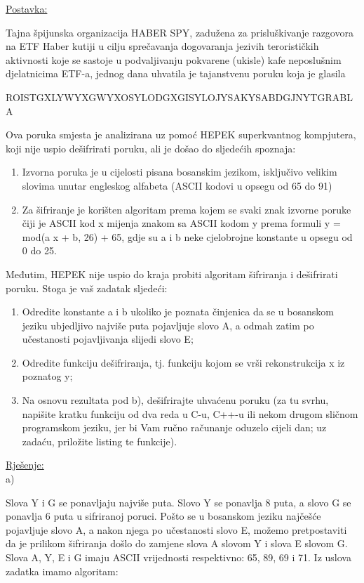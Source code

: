 \documentclass[12pt]{article}
\begin{document}
\underline{Postavka:}

Tajna špijunska organizacija HABER SPY, zadužena za prisluškivanje razgovora na ETF Haber kutiji u cilju sprečavanja dogovaranja jezivih terorističkih aktivnosti koje se sastoje u podvaljivanju pokvarene (ukisle) kafe neposlušnim djelatnicima ETF-a, jednog dana uhvatila je tajanstvenu poruku koja je glasila

ROISTGXLYWYXGWYXOSYLODGXGISYLOJYSAKYSABDGJNYTGRABLA

Ova poruka smjesta je analizirana uz pomoć HEPEK superkvantnog kompjutera, koji nije uspio dešifrirati poruku, ali je došao do sljedećih spoznaja:

\begin{enumerate}
\item Izvorna poruka je u cijelosti pisana bosanskim jezikom, isključivo velikim slovima unutar engleskog alfabeta (ASCII kodovi u opsegu od 65 do 91)
\item Za šifriranje je korišten algoritam prema kojem se svaki znak izvorne poruke čiji je ASCII kod x mijenja znakom sa ASCII kodom y prema formuli y = mod(a x + b, 26) + 65, gdje su a i b neke cjelobrojne konstante u opsegu od 0 do 25.
\end{enumerate}

Međutim, HEPEK nije uspio do kraja probiti algoritam šifriranja i dešifrirati poruku. Stoga je vaš zadatak sljedeći:

\begin{enumerate}
\item Odredite konstante a i b ukoliko je poznata činjenica da se u bosanskom jeziku ubjedljivo najviše puta pojavljuje slovo A, a odmah zatim po učestanosti pojavljivanja slijedi slovo E;
\item Odredite funkciju dešifriranja, tj. funkciju kojom se vrši rekonstrukcija x iz poznatog y;
\item Na osnovu rezultata pod b), dešifrirajte uhvaćenu poruku (za tu svrhu, napišite kratku funkciju od dva reda u C-u, C++-u ili nekom drugom sličnom programskom jeziku, jer bi Vam ručno računanje oduzelo cijeli dan; uz zadaću, priložite listing te funkcije).
\end{enumerate}

\underline{Rješenje:}\\
\newpage
a)

\hspace{0.65cm}Slova Y i G se ponavljaju najviše puta. Slovo Y se ponavlja 8 puta, a slovo G se ponavlja 6 puta u sifriranoj poruci. Pošto se u bosanskom jeziku najčešće pojavljuje slovo A, a nakon njega po učestanosti slovo E, možemo pretpostaviti da je prilikom šifriranja došlo do zamjene slova A slovom Y i slova E slovom G. Slova A, Y, E i G imaju ASCII vrijednosti respektivno: 65, 89, 69 i 71. Iz uslova zadatka imamo algoritam:
\end{document}
